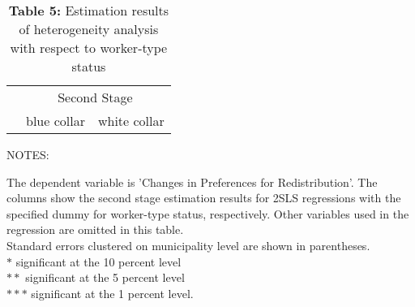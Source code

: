 \documentclass[12pt,a4paper]{standalone}
\newcommand\tab[1][1cm]{\hspace*{#1}}
\newcommand\tabs[1][0.8cm]{\hspace*{#1}}
\newcommand\tabu[1][0.4cm]{\hspace*{#1}}
\begin{document}
\begin{minipage}[c][15cm]{1.2 \textwidth}

\thispagestyle{empty}

\begin{table}
\centering
\caption*{\textbf{Table 5:} Estimation results of heterogeneity analysis \\ with respect to worker-type status}

\begin{threeparttable}
\begin{tabular}{lcc}

    \toprule
    & \multicolumn{2}{c}{Second Stage} \\ 
    \cmidrule(lr){2-3}
    & blue collar & white collar  \\

    \midrule
 

    \bottomrule
\end{tabular}

    \begin{tablenotes}
    \item NOTES:
	\par
	\begingroup
	\leftskip=0.3cm %
	\noindent 
	The dependent variable is 'Changes in Preferences for 		Redistribution'. The columns show the second stage 			estimation results for 2SLS regressions with the 			specified dummy for worker-type status, respectively. 		Other variables used in the regression are omitted in 		this table.\\
    Standard errors clustered on municipality level are 		shown in parentheses. \\
    $ \ast $ \tab significant at the 10 percent level \\
    $ \ast \ast $ \tabs significant at the 5 percent level 	\\
    $ \ast \ast \ast $ \tabu significant at the 1 percent 		level.
	\par
	\endgroup




    \end{tablenotes}
\end{threeparttable}
\end{table}

\end{minipage}
\end{document}
